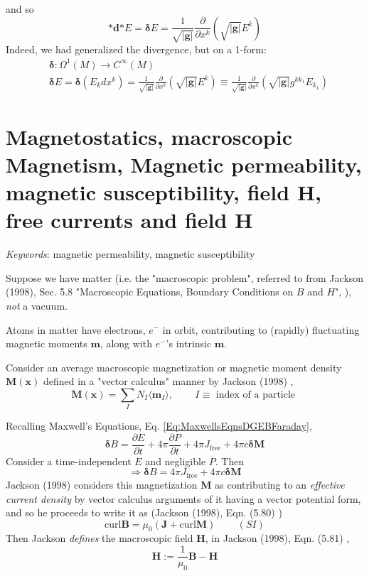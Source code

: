 \documentclass[10pt]{amsart}
\begin{document}
\begin{multicols*}{2}
\[\]
and so 
\[
\mathbf{*} \mathbf{d} \mathbf{*} E = \mathbf{\delta} E = \frac{1}{\sqrt{ |\mathbf{g} | } } \frac{ \partial }{ \partial x^k} ( \sqrt{ | \mathbf{g} | } E^k )
\]
Indeed, we had generalized the divergence, but on a 1-form:
\begin{equation}
\begin{aligned}
	& \mathbf{\delta} : \Omega^1(M) \to C^{\infty}(M) \\ 
	& \mathbf{\delta} E = \mathbf{\delta} (E_kdx^k)  = \frac{1}{\sqrt{|\mathbf{g} |} } \frac{ \partial }{ \partial x^k} (\sqrt{ |\mathbf{g} | } E^k) \equiv \frac{1}{\sqrt{ |\mathbf{g} | } } \frac{ \partial }{ \partial x^k} ( \sqrt{ |\mathbf{g} | }  g^{kk_1} E_{k_1} )
\end{aligned}
\end{equation}

\section{Magnetostatics, macroscopic Magnetism, Magnetic permeability, magnetic susceptibility, field $\mathbf{H}$, free currents and field $\mathbf{H}$}

\emph{Keywords}: magnetic permeability, magnetic susceptibility

Suppose we have matter (i.e. the "macroscopic problem", referred to from Jackson (1998), Sec. 5.8 "Macroscopic Equations, Boundary Conditions on $B$ and $H$", \cite{Jack1998}), \emph{not} a vacuum.  

Atoms in matter have electrons, $e^-$ in orbit, contributing to (rapidly) fluctuating magnetic moments $\mathbf{m}$, along with $e^-$'s intrinsic $\mathbf{m}$.  

Consider an average macroscopic magnetization or magnetic moment density $\mathbf{M}(\mathbf{x})$ defined in a "vector calculus" manner by Jackson (1998) \cite{Jack1998}, 
\[
\mathbf{M}(\mathbf{x}) = \sum_I N_I\langle \mathbf{m}_I\rangle , \qquad \, I \equiv \text{ index of a particle } 
\]

Recalling Maxwell's Equations, Eq. \ref{Eq:MaxwellsEqnsDGEBFaraday}, 
\[
\mathbf{\delta} B = \frac{ \partial E}{ \partial t} + 4\pi \frac{ \partial P }{ \partial t} + 4\pi J_{\text{free}} + 4\pi c \mathbf{\delta}\mathbf{M}
\]
Consider a time-independent $E$ and negligible $P$.  Then 
\[
\Longrightarrow \mathbf{\delta} B =  4\pi J_{\text{free}} + 4\pi c \mathbf{\delta}\mathbf{M}
\]
Jackson (1998) \cite{Jack1998} considers this magnetization $\mathbf{M}$ as contributing to an \emph{effective current density} by vector calculus arguments of it having a vector potential form, and so he proceeds to write it as (Jackson (1998), Eqn. (5.80) \cite{Jack1998})
\[
\text{curl} \mathbf{B} = \mu_0 (\mathbf{J} + \text{curl}\mathbf{M} ) \qquad \, (SI)
\]
Then Jackson \emph{defines} the macroscopic field $\mathbf{H}$, in Jackson (1998), Eqn. (5.81) \cite{Jack1998}, 
\[
\mathbf{H} := \frac{1}{\mu_0} \mathbf{B} - \mathbf{H}
\]


\end{multicols*}
\end{document}
